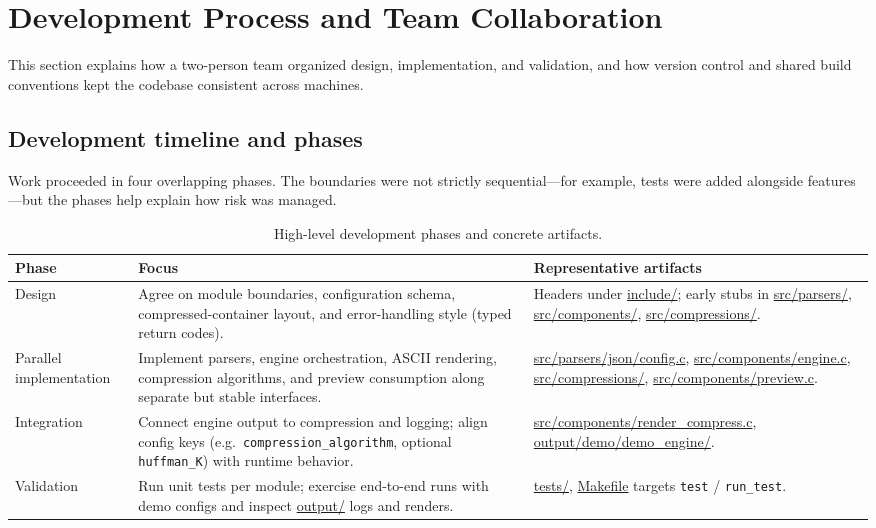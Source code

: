 \section{Development Process and Team Collaboration}

This section explains how a two-person team organized design, implementation, and validation, and how version control and shared build conventions kept the codebase consistent across machines.

\subsection{Development timeline and phases}
Work proceeded in four overlapping phases. The boundaries were not strictly sequential—for example, tests were added alongside features—but the phases help explain how risk was managed.

\begin{table}[htbp]
    \centering
    \small
    \caption{High-level development phases and concrete artifacts.}
    \label{tab:dev_phases}
    \begin{tabularx}{\textwidth}{@{}l X X@{}}
        \toprule
        \textbf{Phase} & \textbf{Focus} & \textbf{Representative artifacts} \\
        \midrule
        Design &
        Agree on module boundaries, configuration schema, compressed-container layout, and error-handling style (typed return codes). &
        Headers under \url{include/}; early stubs in \url{src/parsers/}, \url{src/components/}, \url{src/compressions/}. \\
        \addlinespace
        Parallel implementation &
        Implement parsers, engine orchestration, ASCII rendering, compression algorithms, and preview consumption along separate but stable interfaces. &
        \url{src/parsers/json/config.c}, \url{src/components/engine.c}, \url{src/compressions/}, \url{src/components/preview.c}. \\
        \addlinespace
        Integration &
        Connect engine output to compression and logging; align config keys (e.g.\ \texttt{compression\_algorithm}, optional \texttt{huffman\_K}) with runtime behavior. &
        \url{src/components/render_compress.c}, \url{output/demo/demo_engine/}. \\
        \addlinespace
        Validation &
        Run unit tests per module; exercise end-to-end runs with demo configs and inspect \url{output/} logs and renders. &
        \url{tests/}, \url{Makefile} targets \texttt{test} / \texttt{run\_test}. \\
        \bottomrule
    \end{tabularx}
\end{table}

